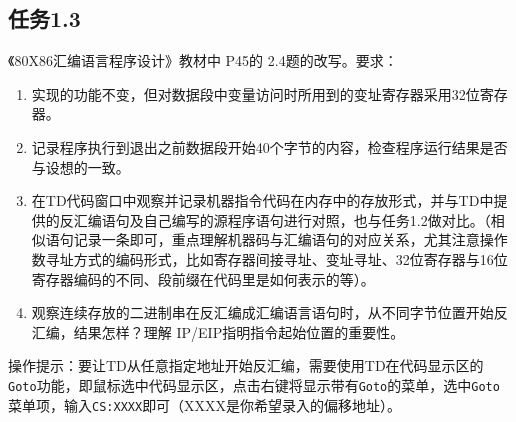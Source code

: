 \documentclass{ctexrep}
\begin{document}
\subsection{任务1.3}
《80X86汇编语言程序设计》教材中 P45的 2.4题的改写。要求：
\begin{enumerate}
    \item 实现的功能不变，但对数据段中变量访问时所用到的变址寄存器采用32位寄存器。
    \item 记录程序执行到退出之前数据段开始40个字节的内容，检查程序运行结果是否与设想的一致。
    \item 在TD代码窗口中观察并记录机器指令代码在内存中的存放形式，并与TD中提供的反汇编语句及自己编写的源程序语句进行对照，也与任务1.2做对比。（相似语句记录一条即可，重点理解机器码与汇编语句的对应关系，尤其注意操作数寻址方式的编码形式，比如寄存器间接寻址、变址寻址、32位寄存器与16位寄存器编码的不同、段前缀在代码里是如何表示的等）。
    \item 观察连续存放的二进制串在反汇编成汇编语言语句时，从不同字节位置开始反汇编，结果怎样？理解 IP/EIP指明指令起始位置的重要性。
\end{enumerate}
操作提示：要让TD从任意指定地址开始反汇编，需要使用TD在代码显示区的\texttt{Goto}功能，即鼠标选中代码显示区，点击右键将显示带有\texttt{Goto}的菜单，选中\texttt{Goto}菜单项，输入\texttt{CS:XXXX}即可（XXXX是你希望录入的偏移地址）。
\end{document}
